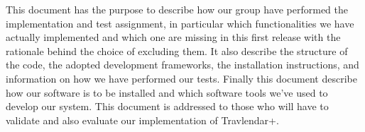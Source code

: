 This document has the purpose to describe how our group have performed the implementation and test assignment, in particular which functionalities we have actually implemented and which one are missing in this first release with the rationale behind the choice of excluding them. It also describe the structure of the code, the adopted development frameworks, the installation instructions, and information on how we have performed our tests.
Finally this document describe how our software is to be installed and which software tools we've used to develop our system.
This document is addressed to those who will have to validate and also evaluate our implementation of Travlendar+.